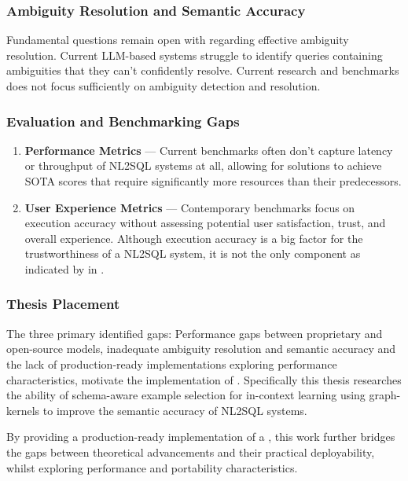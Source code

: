 \subsubsection{Ambiguity Resolution and Semantic Accuracy}

Fundamental questions remain open with regarding effective ambiguity
resolution. Current LLM-based systems struggle to identify queries containing
ambiguities that they can't confidently resolve. Current research and
benchmarks does not focus sufficiently on ambiguity detection and resolution.

\subsubsection{Evaluation and Benchmarking Gaps}

\begin{enumerate}
    \item \textbf{Performance Metrics} — Current benchmarks often don't capture
        latency or throughput of NL2SQL systems at all, allowing for solutions
        to achieve SOTA scores that require significantly more
        resources than their predecessors.
    \item \textbf{User Experience Metrics} — Contemporary benchmarks focus on
        execution accuracy without assessing potential user satisfaction,
        trust, and overall experience. Although execution accuracy is a big
        factor for the trustworthiness of a NL2SQL system, it is not the only
        component as indicated by \citeauthor*{NALIR} in \citeyear{NALIR}.
\end{enumerate}

\subsubsection{Thesis Placement}

The three primary identified gaps: Performance gaps between proprietary and
open-source models, inadequate ambiguity resolution and semantic accuracy and
the lack of production-ready implementations exploring performance
characteristics, motivate the implementation of \Natural. Specifically this
thesis researches the ability of schema-aware example selection for in-context
learning using graph-kernels to improve the semantic accuracy of NL2SQL
systems.

By providing a production-ready implementation of a \Natural, this work
further bridges the gaps between theoretical advancements and their practical
deployability, whilst exploring performance and portability characteristics.
